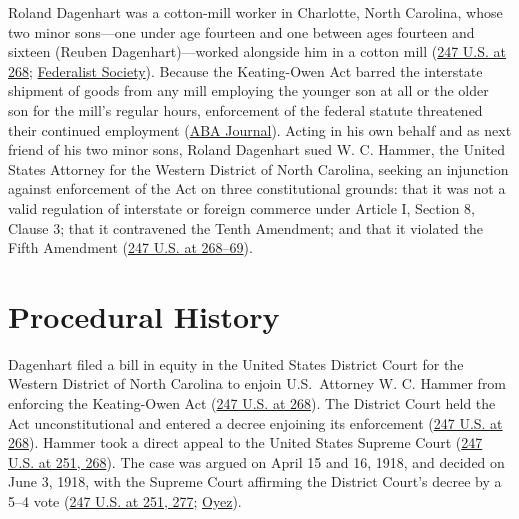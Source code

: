 \documentclass[12pt]{article}
\begin{document}
Roland Dagenhart was a cotton-mill worker in Charlotte, North Carolina, whose two minor sons---one under age fourteen and one between ages fourteen and sixteen (Reuben Dagenhart)---worked alongside him in a cotton mill (\href{https://supreme.justia.com/cases/federal/us/247/251/}{247 U.S. at 268}; \href{https://fedsoc.org/case/hammer-v-dagenhart}{Federalist Society}). Because the Keating-Owen Act barred the interstate shipment of goods from any mill employing the younger son at all or the older son for the mill's regular hours, enforcement of the federal statute threatened their continued employment (\href{https://www.abajournal.com/magazine/article/june_3_1918_child_labor_law_declared_unconstitutional}{ABA Journal}). Acting in his own behalf and as next friend of his two minor sons, Roland Dagenhart sued W. C. Hammer, the United States Attorney for the Western District of North Carolina, seeking an injunction against enforcement of the Act on three constitutional grounds: that it was not a valid regulation of interstate or foreign commerce under Article I, Section 8, Clause 3; that it contravened the Tenth Amendment; and that it violated the Fifth Amendment (\href{https://supreme.justia.com/cases/federal/us/247/251/}{247 U.S. at 268--69}).

\section{Procedural History}
Dagenhart filed a bill in equity in the United States District Court for the Western District of North Carolina to enjoin U.S.\ Attorney W. C. Hammer from enforcing the Keating-Owen Act (\href{https://supreme.justia.com/cases/federal/us/247/251/}{247 U.S. at 268}). The District Court held the Act unconstitutional and entered a decree enjoining its enforcement (\href{https://supreme.justia.com/cases/federal/us/247/251/}{247 U.S. at 268}). Hammer took a direct appeal to the United States Supreme Court (\href{https://supreme.justia.com/cases/federal/us/247/251/}{247 U.S. at 251, 268}). The case was argued on April 15 and 16, 1918, and decided on June 3, 1918, with the Supreme Court affirming the District Court's decree by a 5--4 vote (\href{https://supreme.justia.com/cases/federal/us/247/251/}{247 U.S. at 251, 277}; \href{https://www.oyez.org/cases/1900-1940/247us251}{Oyez}).
\end{document}
